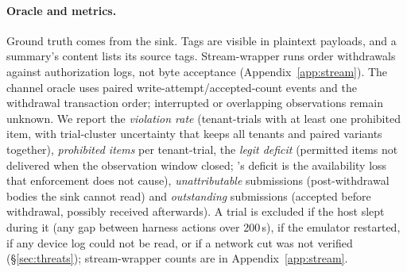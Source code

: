 \paragraph{Oracle and metrics.} Ground truth comes from the sink. Tags are visible in plaintext payloads, and a summary's
content lists its source tags. Stream-wrapper runs order withdrawals against authorization logs, not byte acceptance
(Appendix~\ref{app:stream}). The channel oracle uses paired write-attempt/accepted-count events and the withdrawal
transaction order; interrupted or overlapping observations remain unknown. We report the \emph{violation rate}
(tenant-trials with at least one prohibited item, with trial-cluster uncertainty that keeps all tenants and paired
variants together), \emph{prohibited items} per tenant-trial, the \emph{legit deficit} (permitted items not delivered
when the observation window closed; 's deficit is the availability loss that enforcement does not cause),
\emph{unattributable} submissions (post-withdrawal bodies the sink cannot read) and \emph{outstanding} submissions
(accepted before withdrawal, possibly received afterwards).
A trial is excluded if the host slept during it (any gap between harness actions over 200\,s), if the emulator restarted,
if any device log could not be read, or if a network cut was not verified (\S\ref{sec:threats}); stream-wrapper counts
are in Appendix~\ref{app:stream}.


